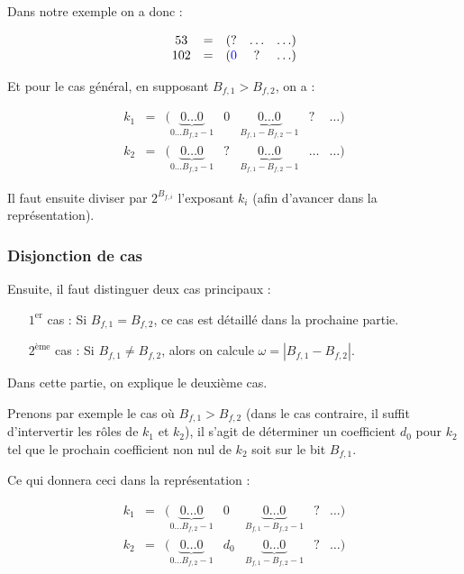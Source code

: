 \documentclass[12pt, a4paper]{memoir}
\begin{document}
 Dans notre exemple on a donc :
 
   $$\begin{array}{ccccc}
  53 & = & (? & \ldots & \ldots) \\
  102 & = & (\textcolor{blue}{0} & ? & \ldots)
 \end{array}$$
  
 Et pour le cas général, en supposant $B_{f,1} > B_{f,2}$, on a :
 
    $$\begin{array}{ccccccc}
   k_1 & = & (\underbrace{0 \ldots 0}_{0 \ldots B_{f,2} - 1} & 0 & \underbrace{0 \ldots 0}_{B_{f,1} - B_{f,2}-1} & ? & \ldots) \\
   k_2 & = & (\underbrace{0 \ldots 0}_{0 \ldots B_{f,2} - 1} & ? & \underbrace{0 \ldots 0}_{B_{f,1} - B_{f,2}-1} & \ldots & \ldots)
   \end{array}$$
 
 Il faut ensuite diviser par $2^{B_{f,i}}$ l'exposant $k_i$ (afin d'avancer dans la représentation).
 
 \subsubsection{Disjonction de cas}
 
 Ensuite, il faut distinguer deux cas principaux :
 \begin{itemize}
  \item [$1^{\text{er}}$ cas :] Si $B_{f,1} = B_{f,2}$, ce cas est détaillé dans la prochaine partie.
  \item [$2^{\text{ème}}$ cas :] Si $B_{f,1} \neq B_{f,2}$, alors on calcule $\omega = |B_{f,1} - B_{f,2}|$.
 \end{itemize}

 Dans cette partie, on explique le deuxième cas.
 
 Prenons par exemple le cas où $B_{f,1} > B_{f,2}$ (dans le cas contraire, il suffit d'intervertir les rôles
 de $k_1$ et $k_2$), il s'agit de déterminer un coefficient $d_0$ pour $k_2$ tel que le prochain coefficient non 
 nul de $k_2$ soit sur le bit $B_{f,1}$.
 
 Ce qui donnera ceci dans la représentation :
 
     $$\begin{array}{ccccccc}
   k_1 & = & (\underbrace{0 \ldots 0}_{0 \ldots B_{f,2} - 1} & 0 & \underbrace{0 \ldots 0}_{B_{f,1} - B_{f,2}-1} & ? & \ldots) \\
   k_2 & = & (\underbrace{0 \ldots 0}_{0 \ldots B_{f,2} - 1} & d_0 & \underbrace{0 \ldots 0}_{B_{f,1} - B_{f,2}-1} & ? & \ldots)
   \end{array}$$
   
\end{document}
